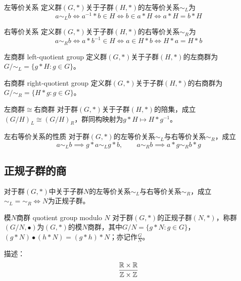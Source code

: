 \begin{definition}{左等价关系}
	定义群$(G,*)$关于子群$(H,*)$的左等价关系$\sim_L$为
	$$
	a\sim_L b \iff
	a^{-1}*b\in H \iff
	b\in a*H \iff
	a*H=b*H
	$$
\end{definition}

\begin{definition}{右等价关系}
	定义群$(G,*)$关于子群$(H,*)$的右等价关系$\sim_R$为
	$$
	a\sim_R b \iff
	a*b^{-1}\in H \iff
	a\in H*b \iff
	H*a=H*b
	$$
\end{definition}

\begin{definition}{左商群 left-quotient group}
	定义群$(G,*)$关于子群$(H,*)$的左商群为$G/\sim_L=\{ g*H:g\in G \}$。
\end{definition}

\begin{definition}{右商群 right-quotient group}
	定义群$(G,*)$关于子群$(H,*)$的右商群为$G/\sim_R=\{ H*g:g\in G \}$。
\end{definition}

\begin{proposition}{左商群$\cong$右商群}
	对于群$(G,*)$关于子群$(H,*)$的陪集，成立$(G/H)_L \cong (G/H)_R$，群同构映射为$g*H\mapsto H*g^{-1}$。
\end{proposition}

\begin{proposition}{左右等价关系的性质}
	对于群$(G,*)$的左等价关系$\sim_L$与右等价关系$\sim_R$，成立
	$$
	a\sim_L b\implies g*a\sim_L g*b,\qquad
	a\sim_R b\implies a*g\sim_R b*g
	$$
\end{proposition}

\subsection{正规子群的商}

\begin{proposition}
	对于群$(G,*)$中关于子群$N$的左等价关系$\sim_L$与右等价关系$\sim_R$，成立$\sim_L=\sim_R\iff N$为正规子群。
\end{proposition}

\begin{definition}{模$N$商群 quotient group modulo $N$}
	对于群$(G,*)$的正规子群$(N,*)$，称群$(G/N,\bullet)$为$(G,*)$的模$N$商群，其中$G/N=\{ g*N:g\in G \}$，$(g*N) \bullet (h*N)=(g*h)*N$；亦记作$\frac{G}{N}$。
\end{definition}

\begin{example}
	描述：
	$$
	\frac{\mathbb{R}\times \mathbb{R}}{\mathbb{Z}\times\mathbb{Z}}
	$$
\end{example}

